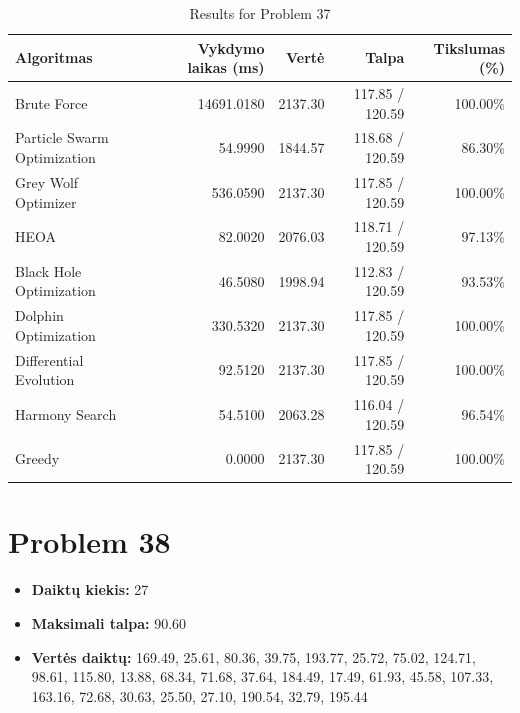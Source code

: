 \documentclass[a4paper,11pt]{article}
\begin{document}
\begin{table}[h!]
\centering
\begin{tabular}{lrrrr}
\toprule
\textbf{Algoritmas} & \textbf{Vykdymo laikas (ms)} & \textbf{Vertė} & \textbf{Talpa} & \textbf{Tikslumas (\%)} \\
\midrule
Brute Force & 14691.0180 & 2137.30 & 117.85 / 120.59 & 100.00\% \\
Particle Swarm Optimization & 54.9990 & 1844.57 & 118.68 / 120.59 & 86.30\% \\
Grey Wolf Optimizer & 536.0590 & 2137.30 & 117.85 / 120.59 & 100.00\% \\
HEOA & 82.0020 & 2076.03 & 118.71 / 120.59 & 97.13\% \\
Black Hole Optimization & 46.5080 & 1998.94 & 112.83 / 120.59 & 93.53\% \\
Dolphin Optimization & 330.5320 & 2137.30 & 117.85 / 120.59 & 100.00\% \\
Differential Evolution & 92.5120 & 2137.30 & 117.85 / 120.59 & 100.00\% \\
Harmony Search & 54.5100 & 2063.28 & 116.04 / 120.59 & 96.54\% \\
Greedy & 0.0000 & 2137.30 & 117.85 / 120.59 & 100.00\% \\
\bottomrule
\end{tabular}
\caption{Results for Problem 37}
\end{table}
\clearpage

\section*{Problem 38}
\begin{itemize}
    \item \textbf{Daiktų kiekis:} 27
    \item \textbf{Maksimali talpa:} 90.60
    \item \textbf{Vertės daiktų:} 169.49, 25.61, 80.36, 39.75, 193.77, 25.72, 75.02, 124.71, 98.61, 115.80, 13.88, 68.34, 71.68, 37.64, 184.49, 17.49, 61.93, 45.58, 107.33, 163.16, 72.68, 30.63, 25.50, 27.10, 190.54, 32.79, 195.44
\end{itemize}
\end{document}

